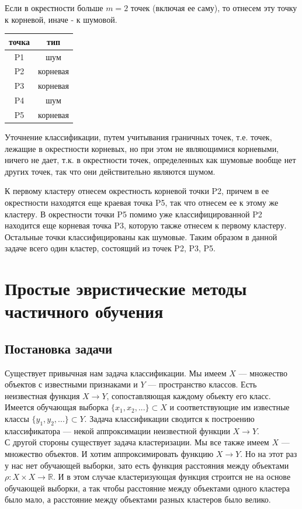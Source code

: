 Если в окрестности больше $m=2$ точек (включая ее саму), то отнесем эту точку к корневой, иначе - к шумовой.

\begin{center}
\begin{tabular}{ |c|c| } 
 \hline
 точка & тип \\\hline
 P1 & шум\\ 
 P2 & корневая\\ 
 P3 & корневая\\ 
 P4 & шум\\
 P5 & корневая\\
 \hline
\end{tabular}
\end{center}

Уточнение классификации, путем учитывания граничных точек, т.е. точек, лежащие в окрестности корневых, но при этом не являющимися корневыми, ничего не дает, т.к. в окрестности точек, определенных как шумовые вообще нет других точек, так что они действительно являются шумом.

К первому кластеру отнесем окрестность корневой точки P2, причем в ее окрестности находятся еще краевая точка P5, так что отнесем ее к этому же кластеру. В окрестности точки P5 помимо уже классифицированной P2 находится еще корневая точка P3, которую также отнесем к первому кластеру. Остальные точки классифицированы как шумовые. Таким образом в данной задаче всего один кластер, состоящий из точек P2, P3, P5.

\section{Простые эвристические методы частичного обучения}
\subsection{Постановка задачи}
Существует привычная нам задача классификации. Мы имеем $X$ --- множество объектов с известными признаками и $Y$ --- пространство классов. Есть неизвестная функция $X \longrightarrow Y$, сопоставляющая каждому обьекту его класс. Имеется обучающая выборка $\{x_1, x_2, ...\} \subset X$ и соответствующие им известные классы $\{y_1, y_2, ...\} \subset Y$. Задача классификации сводится к построению классификатора --- некой аппроксимации неизвестной функции $X \longrightarrow Y$. \\

С другой стороны существует задача кластеризации. Мы все также имеем $X$ --- множество объектов. И хотим аппроксимировать функцию $X \longrightarrow Y$. Но на этот раз у нас нет обучающей выборки, зато есть функция расстояния между объектами $\rho: X\times X \longrightarrow \mathbb{R}$. И в этом случае кластеризующая функция строится не на основе обучающей выборки, а так чтобы расстояние между объектами одного кластера было мало, а расстояние между объектами разных кластеров было велико. \\

